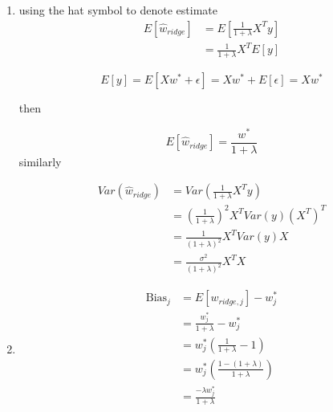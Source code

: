 \documentclass{article}
\begin{document}
\begin{enumerate}
\begin{enumerate}
        for ridge

        \begin{equation}
            (X^TX+\lambda I)^{-1}X^T y = ((1+\lambda)I)^{-1}  X^Ty = \frac{1}{1+\lambda}X^Ty
        \end{equation}

        \item 
        using the hat symbol to denote estimate
        \begin{equation}
            \begin{split}
                E[\hat{w}_{ridge}] &= E\left[ \frac{1}{1+\lambda} X^T y \right]\\
                &= \frac{1}{1+\lambda} X^T E[y]
            \end{split}
        \end{equation}

        $$E[y] = E[Xw^* + \epsilon] = Xw^* + E[\epsilon] = Xw^*$$

        then 

        $$E[\hat{w}_{ridge}] = \frac{w^*}{1+\lambda}$$
        similarly

        \begin{equation}
            \begin{split}
                Var(\hat{w}_{ridge}) &= Var\left( \frac{1}{1+\lambda} X^T y \right)\\
                &= \left( \frac{1}{1+\lambda} \right)^2 X^T Var(y) (X^T)^T\\
                &= \frac{1}{(1+\lambda)^2} X^T Var(y) X\\
                &= \frac{\sigma^2}{(1+\lambda)^2} X^T X
            \end{split}
        \end{equation}
        \item 
        \begin{equation}\begin{split}
                \text{Bias}_j &= E[w_{ridge, j}] - w_j^*\\
                & = \frac{w_j^*}{1+\lambda} - w_j^* \\
                &= w_j^* \left( \frac{1}{1+\lambda} - 1 \right)\\
                & = w_j^* \left( \frac{1 - (1+\lambda)}{1+\lambda} \right) \\
                &= \frac{-\lambda w_j^*}{1+\lambda}\\
        \end{split}
        \end{equation}


\end{enumerate}
\end{enumerate}
\end{document}
